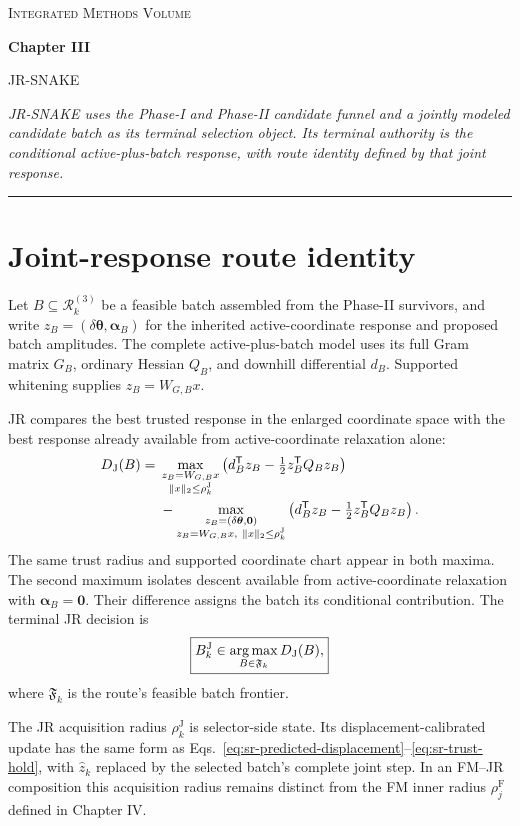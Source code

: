 \documentclass[10pt,twocolumn]{article}
\newcommand{\argmax}{\operatorname*{arg\,max}}
\newcommand{\chapterfront}[3]{%
  \begingroup
  \centering
  {\small\scshape Integrated Methods Volume\par}
  \vspace{0.45em}
  {\Large\bfseries #1\par}
  \vspace{0.25em}
  {\large #2\par}
  \vspace{0.65em}
  \begin{minipage}{0.94\columnwidth}
    \small\itshape #3
  \end{minipage}\par
  \vspace{0.75em}
  \hrule
  \vspace{0.75em}
  \endgroup
}
\begin{document}
\clearpage
\chapterfront
{Chapter III}
{JR-SNAKE}
{JR-SNAKE uses the Phase-I and Phase-II candidate funnel and a jointly modeled
candidate batch as its terminal selection object. Its terminal authority is the
conditional active-plus-batch response, with route identity defined by that
joint response.}

\section*{Joint-response route identity}

Let \(B\subseteq\mathcal R_k^{(3)}\) be a feasible batch assembled from the
Phase-II survivors, and write
\(z_B=(\delta\bm\theta,\bm\alpha_B)\) for the inherited active-coordinate
response and proposed batch amplitudes. The complete active-plus-batch model
uses its full Gram matrix \(G_B\), ordinary Hessian \(Q_B\), and downhill
differential \(d_B\). Supported whitening supplies \(z_B=W_{G,B}x\).

JR compares the best trusted response in the enlarged coordinate space with
the best response already available from active-coordinate relaxation alone:
\begin{align}
D_{\rm J}(B)={}&
\max_{\substack{z_B=W_{G,B}x\\\|x\|_2\leq\rho_k^{\mathrm J}}}
\left(d_B^{\mathsf T}z_B-\tfrac12z_B^{\mathsf T}Q_Bz_B\right)
\nonumber\\
&-
\max_{\substack{z_B=(\delta\bm\theta,\bm0)\\
z_B=W_{G,B}x,\ \|x\|_2\leq\rho_k^{\mathrm J}}}
\left(d_B^{\mathsf T}z_B-\tfrac12z_B^{\mathsf T}Q_Bz_B\right).
\label{eq:jr-conditional}
\end{align}
The same trust radius and supported coordinate chart appear in both maxima.
The second maximum isolates descent available from active-coordinate
relaxation with \(\bm\alpha_B=\bm0\). Their difference assigns the batch its
conditional contribution. The terminal JR decision is
\begin{equation}
\boxed{
B_k^{\rm J}\in\argmax_{B\in\mathfrak F_k}D_{\rm J}(B),}
\label{eq:jr-decision}
\end{equation}
where \(\mathfrak F_k\) is the route's feasible batch frontier.

The JR acquisition radius \(\rho_k^{\mathrm J}\) is selector-side state. Its
displacement-calibrated update has the same form as
Eqs.~\eqref{eq:sr-predicted-displacement}--\eqref{eq:sr-trust-hold}, with
\(\widehat z_k\) replaced by the selected batch's complete joint step. In an
FM--JR composition this acquisition radius remains distinct from the FM inner
radius \(\rho_j^{\mathrm F}\) defined in Chapter IV.
\end{document}
